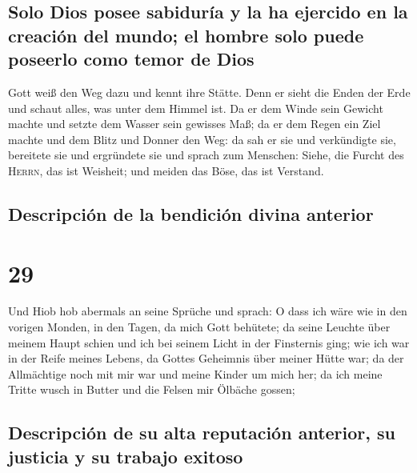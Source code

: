 \hypertarget{solo-dios-posee-sabiduruxeda-y-la-ha-ejercido-en-la-creaciuxf3n-del-mundo-el-hombre-solo-puede-poseerlo-como-temor-de-dios}{%
\subsection{Solo Dios posee sabiduría y la ha ejercido en la creación
del mundo; el hombre solo puede poseerlo como temor de
Dios}\label{solo-dios-posee-sabiduruxeda-y-la-ha-ejercido-en-la-creaciuxf3n-del-mundo-el-hombre-solo-puede-poseerlo-como-temor-de-dios}}

 Gott weiß den Weg dazu und kennt ihre Stätte.
 Denn er sieht die Enden der Erde und schaut alles, was
unter dem Himmel ist.  Da er dem Winde sein Gewicht
machte und setzte dem Wasser sein gewisses Maß;  da er
dem Regen ein Ziel machte und dem Blitz und Donner den Weg:
 da sah er sie und verkündigte sie, bereitete sie und
ergründete sie  und sprach zum Menschen: Siehe, die
Furcht des \textsc{Herrn}, das ist Weisheit; und meiden das Böse, das
ist Verstand.

\hypertarget{descripciuxf3n-de-la-bendiciuxf3n-divina-anterior}{%
\subsection{Descripción de la bendición divina
anterior}\label{descripciuxf3n-de-la-bendiciuxf3n-divina-anterior}}

\hypertarget{section-28}{%
\section{29}\label{section-28}}

 Und Hiob hob abermals an seine Sprüche und sprach:
 O dass ich wäre wie in den vorigen Monden, in den Tagen,
da mich Gott behütete;  da seine Leuchte über meinem Haupt
schien und ich bei seinem Licht in der Finsternis ging; 
wie ich war in der Reife meines Lebens, da Gottes Geheimnis über meiner
Hütte war;  da der Allmächtige noch mit mir war und meine
Kinder um mich her;  da ich meine Tritte wusch in Butter
und die Felsen mir Ölbäche gossen;

\hypertarget{descripciuxf3n-de-su-alta-reputaciuxf3n-anterior-su-justicia-y-su-trabajo-exitoso}{%
\subsection{Descripción de su alta reputación anterior, su justicia y su
trabajo
exitoso}\label{descripciuxf3n-de-su-alta-reputaciuxf3n-anterior-su-justicia-y-su-trabajo-exitoso}}

